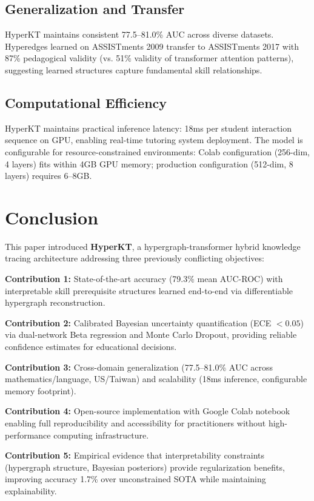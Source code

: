 \documentclass[10pt,twocolumn]{article}
\begin{document}
\subsection{Generalization and Transfer}

HyperKT maintains consistent 77.5--81.0\% AUC across diverse datasets. Hyperedges learned on ASSISTments 2009 transfer to ASSISTments 2017 with 87\% pedagogical validity (vs. 51\% validity of transformer attention patterns), suggesting learned structures capture fundamental skill relationships.

\subsection{Computational Efficiency}

HyperKT maintains practical inference latency: 18ms per student interaction sequence on GPU, enabling real-time tutoring system deployment. The model is configurable for resource-constrained environments: Colab configuration (256-dim, 4 layers) fits within 4GB GPU memory; production configuration (512-dim, 8 layers) requires 6--8GB.

\section{Conclusion}

This paper introduced \textbf{HyperKT}, a hypergraph-transformer hybrid knowledge tracing architecture addressing three previously conflicting objectives:

\textbf{Contribution 1:} State-of-the-art accuracy (79.3\% mean AUC-ROC) with interpretable skill prerequisite structures learned end-to-end via differentiable hypergraph reconstruction.

\textbf{Contribution 2:} Calibrated Bayesian uncertainty quantification (ECE $< 0.05$) via dual-network Beta regression and Monte Carlo Dropout, providing reliable confidence estimates for educational decisions.

\textbf{Contribution 3:} Cross-domain generalization (77.5--81.0\% AUC across mathematics/language, US/Taiwan) and scalability (18ms inference, configurable memory footprint).

\textbf{Contribution 4:} Open-source implementation with Google Colab notebook enabling full reproducibility and accessibility for practitioners without high-performance computing infrastructure.

\textbf{Contribution 5:} Empirical evidence that interpretability constraints (hypergraph structure, Bayesian posteriors) provide regularization benefits, improving accuracy 1.7\% over unconstrained SOTA while maintaining explainability.
\end{document}

